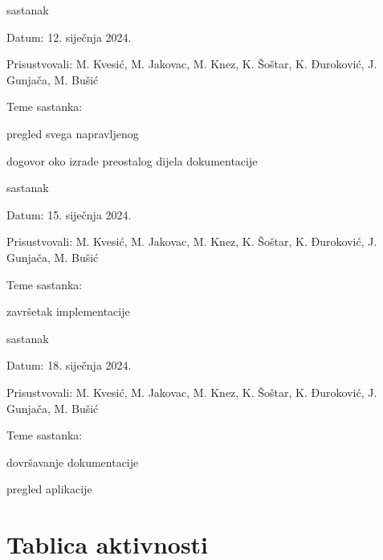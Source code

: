 \begin{packed_enum}
			\item  sastanak
			\item[] \begin{packed_item}
				\item Datum: 12. siječnja 2024.
				\item Prisustvovali: M. Kvesić, M. Jakovac, M. Knez, K. Šoštar, K. Đuroković, J. Gunjača, M. Bušić
				\item Teme sastanka:
				\begin{packed_item}
					\item  pregled svega napravljenog
					\item  dogovor oko izrade preostalog dijela dokumentacije
				\end{packed_item}
			\end{packed_item}
			\item  sastanak
			\item[] \begin{packed_item}
				\item Datum: 15. siječnja 2024.
				\item Prisustvovali: M. Kvesić, M. Jakovac, M. Knez, K. Šoštar, K. Đuroković, J. Gunjača, M. Bušić
				\item Teme sastanka:
				\begin{packed_item}
					\item  završetak implementacije
				\end{packed_item}
			\end{packed_item}
			\item  sastanak
			\item[] \begin{packed_item}
				\item Datum: 18. siječnja 2024.
				\item Prisustvovali: M. Kvesić, M. Jakovac, M. Knez, K. Šoštar, K. Đuroković, J. Gunjača, M. Bušić
				\item Teme sastanka:
				\begin{packed_item}
					\item  dovršavanje dokumentacije
					\item  pregled aplikacije
				\end{packed_item}
			\end{packed_item}
			
			 
			
			
		\end{packed_enum}
		
		\eject
		\section*{Tablica aktivnosti}
		

